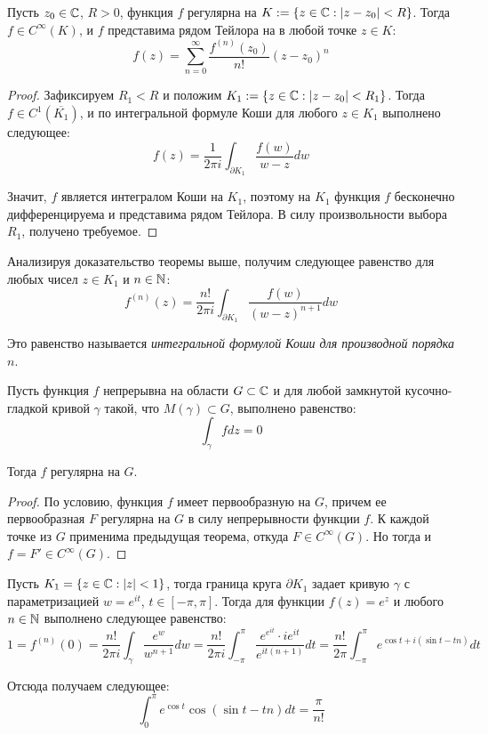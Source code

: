 \begin{theorem}
	Пусть $z_0 \in \mathbb{C}$, $R > 0$, функция $f$ регулярна на $K := \{z \in \mathbb{C} : |z - z_0| < R\}$. Тогда $f \in C^\infty(K)$, и $f$ представима рядом Тейлора на в любой точке $z \in K$:
	\[f(z) = \sum_{n = 0}^\infty \frac{f^{(n)}(z_0)}{n!}(z - z_0)^n\]
\end{theorem}

\begin{proof}
	Зафиксируем $R_1 < R$ и положим $K_1 := \{z \in \mathbb{C}: |z - z_0| < R_1\}$. Тогда $f \in C^1(\overline{K_1})$, и по интегральной формуле Коши для любого $z \in K_1$ выполнено следующее:
	\[f(z) = \frac{1}{2\pi i}\int_{\partial K_1}\frac{f(w)}{w - z}dw\]
	
	Значит, $f$ является интегралом Коши на $K_1$, поэтому на $K_1$ функция $f$ бесконечно дифференцируема и представима рядом Тейлора. В силу произвольности выбора $R_1$, получено требуемое.
\end{proof}

\begin{note}
	Анализируя доказательство теоремы выше, получим следующее равенство для любых чисел $z \in K_1$ и $n \in \mathbb{N}$:
	\[f^{(n)}(z) = \frac{n!}{2\pi i}\int_{\partial K_1}\frac{f(w)}{(w - z)^{n+1}}dw\]
	
	Это равенство называется \textit{интегральной формулой Коши для производной порядка $n$}.
\end{note}

\begin{theorem}[Мореры]
	Пусть функция $f$ непрерывна на области $G \subset \mathbb{C}$ и для любой замкнутой кусочно-гладкой кривой $\gamma$ такой, что $M(\gamma) \subset G$, выполнено равенство:
	\[\int_\gamma fdz = 0\]
	
	Тогда $f$ регулярна на $G$.
\end{theorem}

\begin{proof}
	По условию, функция $f$ имеет первообразную на $G$, причем ее первообразная $F$ регулярна на $G$ в силу непрерывности функции $f$. К каждой точке из $G$ применима предыдущая теорема, откуда $F \in C^\infty(G)$. Но тогда и $f = F' \in C^\infty(G)$.
\end{proof}

\begin{example}
	Пусть $K_1 = \{z \in \mathbb{C}: |z| < 1\}$, тогда граница круга $\partial K_1$ задает кривую $\gamma$ с параметризацией $w = e^{it}$, $t \in [-\pi, \pi]$. Тогда для функции $f(z) = e^z$ и любого $n \in \mathbb{N}$ выполнено следующее равенство:
	\[1 = f^{(n)}(0) = \frac{n!}{2\pi i} \int_\gamma \frac{e^w}{w^{n+1}}dw = \frac{n!}{2\pi i} \int_{-\pi}^\pi \frac{e^{e^{it}}\cdot ie^{it}}{e^{it(n+1)}}dt = \frac{n!}{2\pi} \int_{-\pi}^\pi e^{\cos{t} + i(\sin{t} - tn)}dt\]
	
	Отсюда получаем следующее:
	\[\int_{0}^\pi e^{\cos{t}}\cos{(\sin{t} - tn)}dt = \frac\pi{n!}\]
\end{example}